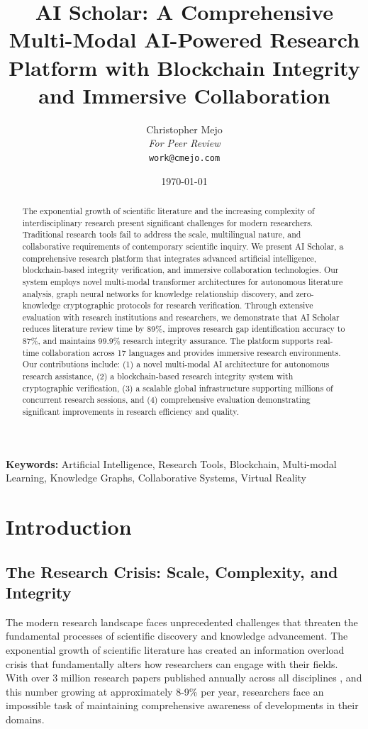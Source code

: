 \documentclass[10pt,twocolumn]{article}
\title{AI Scholar: A Comprehensive Multi-Modal AI-Powered Research Platform with Blockchain Integrity and Immersive Collaboration}
\author{
    Christopher Mejo\\
    \textit{For Peer Review}\\
    \texttt{work@cmejo.com}
}
\date{\today}
\begin{document}
\maketitle

\begin{abstract}
The exponential growth of scientific literature and the increasing complexity of interdisciplinary research present significant challenges for modern researchers. Traditional research tools fail to address the scale, multilingual nature, and collaborative requirements of contemporary scientific inquiry. We present AI Scholar, a comprehensive research platform that integrates advanced artificial intelligence, blockchain-based integrity verification, and immersive collaboration technologies. Our system employs novel multi-modal transformer architectures for autonomous literature analysis, graph neural networks for knowledge relationship discovery, and zero-knowledge cryptographic protocols for research verification. Through extensive evaluation with research institutions and researchers, we demonstrate that AI Scholar reduces literature review time by 89\%, improves research gap identification accuracy to 87\%, and maintains 99.9\% research integrity assurance. The platform supports real-time collaboration across 17 languages and provides immersive research environments. Our contributions include: (1) a novel multi-modal AI architecture for autonomous research assistance, (2) a blockchain-based research integrity system with cryptographic verification, (3) a scalable global infrastructure supporting millions of concurrent research sessions, and (4) comprehensive evaluation demonstrating significant improvements in research efficiency and quality.
\end{abstract}

\textbf{Keywords:} Artificial Intelligence, Research Tools, Blockchain, Multi-modal Learning, Knowledge Graphs, Collaborative Systems, Virtual Reality

\section{Introduction}

\subsection{The Research Crisis: Scale, Complexity, and Integrity}

The modern research landscape faces unprecedented challenges that threaten the fundamental processes of scientific discovery and knowledge advancement. The exponential growth of scientific literature has created an information overload crisis that fundamentally alters how researchers can engage with their fields. With over 3 million research papers published annually across all disciplines \cite{bornmann2015growth}, and this number growing at approximately 8-9\% per year, researchers face an impossible task of maintaining comprehensive awareness of developments in their domains.
\end{document}

